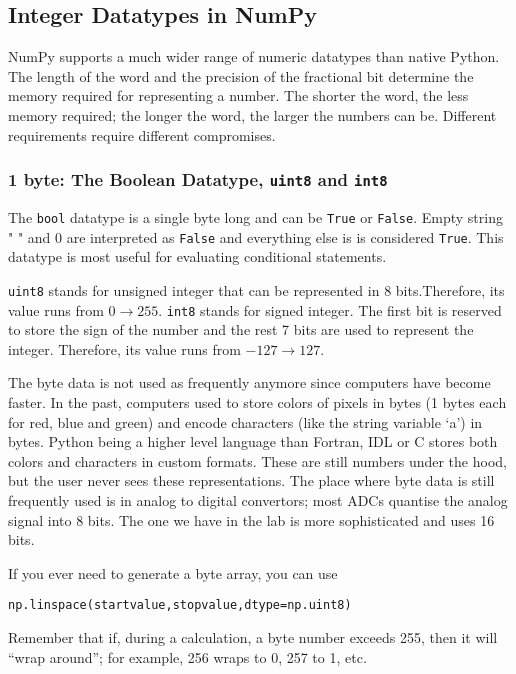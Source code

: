 \documentclass[psfig,preprint]{aastex}
\begin{document}
\subsection {Integer Datatypes in NumPy}
	NumPy supports a much wider range of numeric datatypes than 
native Python. The length of the word and the precision of the fractional bit 
determine the memory required for representing a number. The shorter the word, 
the less memory required; the longer the word, the larger the numbers can be. 
Different requirements require different compromises.

\subsubsection {1 byte: The Boolean Datatype, \texttt{uint8} and \texttt{int8}}

	The \verb;bool; datatype is a single byte long and can be \verb;True; 
or \verb;False;. Empty string " " and $0$ are interpreted as \verb;False; and 
everything else is is considered \verb;True;. This datatype is most useful for
evaluating conditional statements.

	\verb;uint8; stands for unsigned integer that can be represented in 
8 bits.Therefore, its value runs from $0 \rightarrow 255$. \verb;int8; stands 
for signed integer. The first bit is reserved to store the sign of the number 
and the rest 7 bits are used to represent the integer. Therefore, its value 
runs from $-127 \rightarrow 127$.

The byte data is not used as frequently anymore since computers have become faster. 
In the past, computers used to store colors of pixels in bytes (1 bytes each for 
red, blue and green) and encode characters (like the string variable `a') in bytes. 
Python being a higher level language than Fortran, IDL or C stores both colors and 
characters in custom formats. These are still numbers under the hood, but the user 
never sees these representations. The place where byte data is still frequently used 
is in analog to digital convertors; most ADCs quantise the analog signal into 8 bits. 
The one we have in the lab is more sophisticated and uses 16 bits.

If you ever need to generate a byte array, you can use

{\tt np.linspace(startvalue,stopvalue,dtype=np.uint8)}

Remember that if, during a calculation, a byte number exceeds 255, then it will ``wrap around''; for example, 256 wraps to 0, 257 to 1, etc.
\end{document}
